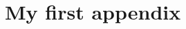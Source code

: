 \documentclass[
  numbers=noenddot,
  english,  %
  a4paper,  %
  twoside,  %
  bibliography=totoc,
  headsepline,
  cleardoublepage=empty,
  parskip=half,
  draft=false
]{scrbook}
\theoremstyle{break}
\begin{document}
\clearpage
\appendix

\chapter{My first appendix}\label{sec:appendix1}

\lipsum[1]

\pagestyle{empty}
\renewcommand*{\chapterpagestyle}{empty}
\Versicherung
\end{document}
